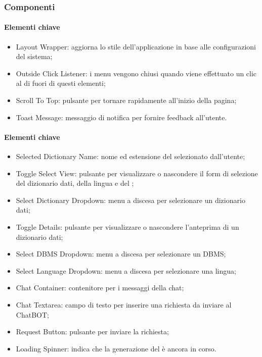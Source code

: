 \subsubsection{Componenti} \label{Componenti}


\paragraph*{Elementi chiave}
\begin{itemize}
  \item Layout Wrapper: aggiorna lo stile dell'applicazione in base alle configurazioni del sistema;
  \item Outside Click Listener: i menu vengono chiusi quando viene effettuato un clic al di fuori di questi elementi;
  \item Scroll To Top: pulsante per tornare rapidamente all'inizio della pagina;
  \item Toast Message: messaggio di notifica per fornire feedback all'utente.
\end{itemize}


\paragraph*{Elementi chiave}
\begin{itemize}
  \item Selected Dictionary Name: nome ed estensione del  selezionato dall'utente;
  \item Toggle Select View: pulsante per visualizzare o nascondere il form di selezione del dizionario dati, della lingua e del ;
  \item Select Dictionary Dropdown: menu a discesa per selezionare un dizionario dati;
  \item Toggle Details: pulsante per visualizzare o nascondere l'anteprima di un dizionario dati;
  \item Select DBMS Dropdown: menu a discesa per selezionare un DBMS;
  \item Select Language Dropdown: menu a discesa per selezionare una lingua;
  \item Chat Container: contenitore per i messaggi della chat;
  \item Chat Textarea: campo di testo per inserire una richiesta da inviare al ChatBOT;
  \item Request Button: pulsante per inviare la richiesta;
  \item Loading Spinner: indica che la generazione del  è ancora in corso.
\end{itemize}

